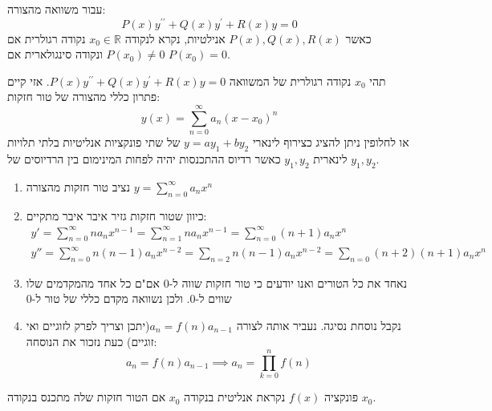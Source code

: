 \documentclass{tstextbook}
\begin{document}
\begin{definition}
עבור משוואה מהצורה:
$$P\left(x\right)y^{\prime\prime}+Q\left(x\right)y^{\prime}+R\left(x\right)y=0$$
כאשר \(P(x),Q(x),R(x)\) אנילטיות, נקרא לנקודה \(x_{0} \in \mathbb{R}\) נקודה רגולרית אם \(P(x_{0})\neq 0\) ונקודה סינגולארית אם \(P(x_{0})=0\).

\end{definition}
\begin{proposition}
תהי \(x_{0}\) נקודה רגולרית של המשוואה \(P\left(x\right)y^{\prime\prime}+Q\left(x\right)y^{\prime}+R\left(x\right)y=0\). אזי קיים פתרון כללי מהצורה של טור חזקות:
$$y\left(x\right)=\sum_{n=0}^{\infty}a_{n}\left(x-x_{0}\right)^{n}$$
או לחלופין ניתן להציג כצירוף לינארי \(y=ay_{1}+by_{2}\) של שתי פונקציות אנליטיות בלתי תלויות לינארית \(y_{1},y_{2}\) כאשר רדיוס ההתכנסות יהיה לפחות המינימום בין הרדיוסים של \(y_{1},y_{2}\). 

\end{proposition}
\begin{proposition}
  \begin{enumerate}
    \item נציב טור חזקות מהצורה \(y=\sum_{n=0}^\infty a_{n}x^n\)


    \item כיוון שטור חזקות גזיר איבר איבר מתקיים: 
\begin{gather*}y'=\sum_{n=0}^\infty na_{n}x^{n-1}=\sum_{n=1}^\infty n a_{n}x^{n-1}=\sum_{n=0}^\infty (n+1)a_{n}x^{n} \\y''=\sum_{n=0}^\infty n(n-1)a_{n}x^{n-2}=\sum_{n=2}n(n-1)a_{n}x^{n-2}=\sum_{n=0}(n+2)(n+1)a_{n}x^n
\end{gather*}


    \item נאחד את כל הטורים ואנו יודעים כי טור חזקות שווה ל-0 אם"ם כל אחד מהמקדמים שלו שווים ל-0. ולכן נשוואה מקדם כללי של טור ל-0 


    \item נקבל נוסחת נסיגה. נעביר אותה לצורה \(a_{n}=f(n)a_{n-1}\)(יתכן וצריך לפרק לזוגיים ואי זוגיים) כעת נזכור את הנוסחה: 
$$a_{n}=f(n)a_{n-1}\implies a_{n}= \prod_{k=0}^n f(n)$$


  \end{enumerate}
\end{proposition}
\begin{reminder}
פונקציה \(f(x)\) נקראת אנליטית בנקודה \(x_{0}\) אם הטור חזקות שלה מתכנס בנקודה \(x_{0}\).

\end{reminder}
\end{document}
